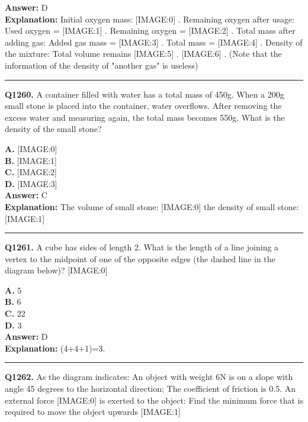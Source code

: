 \documentclass[12pt]{article}
\begin{document}
\textbf{Answer:} D \\
\textbf{Explanation:} Initial oxygen mass:
[IMAGE:0]
.
Remaining oxygen after usage:
Used oxygen =
[IMAGE:1]
.
Remaining oxygen =
[IMAGE:2]
.
Total mass after adding gas:
Added gas mass =
[IMAGE:3]
.
Total mass =
[IMAGE:4]
.
Density of the mixture:
Total volume remains
[IMAGE:5]
.
[IMAGE:6]
.
(Note that the information of the density of "another gas" is useless)

\hrule
\vspace{1em}


\noindent
\textbf{Q1260.} A container filled with water has a total mass of 450g. When a 200g small stone is placed into the container, water overflows. After removing the excess water and measuring again, the total mass becomes 550g. What is the density of the small stone?



\textbf{A.} [IMAGE:0] \\
\textbf{B.} [IMAGE:1] \\
\textbf{C.} [IMAGE:2] \\
\textbf{D.} [IMAGE:3] \\

\textbf{Answer:} C \\
\textbf{Explanation:} The volume of small stone:
[IMAGE:0]
the density of small stone:
[IMAGE:1]

\hrule
\vspace{1em}


\noindent
\textbf{Q1261.} A cube has sides of length 2. What is the length of a line joining a vertex to the midpoint of one of the opposite edges (the dashed line in the diagram below)?
[IMAGE:0]



\textbf{A.} \sqrt{}5 \\
\textbf{B.} \sqrt{}6 \\
\textbf{C.} 2\sqrt{}2 \\
\textbf{D.} 3 \\

\textbf{Answer:} D \\
\textbf{Explanation:} \sqrt{}(4+4+1)=3.

\hrule
\vspace{1em}


\noindent
\textbf{Q1262.} As the diagram indicates: An object with weight 6N is on a slope with angle 45 degrees to the horizontal direction; The coefficient of friction is 0.5. An external force
[IMAGE:0]
is exerted to the object: Find the minimum force that is required to move the object upwards
[IMAGE:1]
\end{document}
